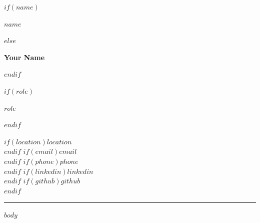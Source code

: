 \documentclass[$if(fontsize)$$fontsize$$else$10pt$endif$,a4paper]{article}
\newcommand{\cvname}[1]{
  {\Huge\bfseries\color{TextMain} #1}
}
\newcommand{\cvrole}[1]{
  \vspace{2pt}
  {\Large\color{Accent} #1}
}
\newcommand{\accentbar}{
  \vspace{8pt}
  {\color{Accent}\rule{\linewidth}{2.2pt}}
  \vspace{6pt}
}
\begin{document}
\color{TextMain}

\begin{minipage}[t]{0.67\linewidth}
$if(name)$
  \cvname{$name$}
$else$
  \cvname{Your Name}
$endif$

$if(role)$
  \cvrole{$role$}
$endif$
\end{minipage}
\hfill
\begin{minipage}[t]{0.30\linewidth}
\raggedleft
{\small
$if(location)$\textcolor{TextMuted}{$location$}\\$endif$
$if(email)$\href{mailto:$email$}{$email$}\\$endif$
$if(phone)$\textcolor{TextMuted}{$phone$}\\$endif$
$if(linkedin)$\href{https://$linkedin$}{$linkedin$}\\$endif$
$if(github)$\href{https://$github$}{$github$}\\$endif$
}
\end{minipage}

\accentbar

$body$
\end{document}
